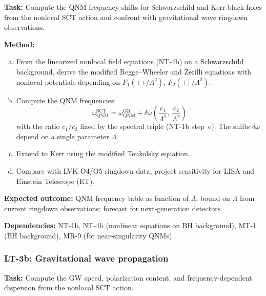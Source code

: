 \documentclass[12pt,a4paper]{article}
\newcommand{\Lam}{\Lambda}
\newcommand{\task}[1]{\noindent\textbf{Task:} #1\par}
\newcommand{\method}[1]{\noindent\textbf{Method:} #1\par}
\newcommand{\outcome}[1]{\noindent\textbf{Expected outcome:} #1\par}
\newcommand{\deps}[1]{\noindent\textbf{Dependencies:} #1\par}
\begin{document}
\task{Compute the QNM frequency shifts for Schwarzschild and Kerr black
holes from the nonlocal SCT action and confront with gravitational wave
ringdown observations.}

\method{
\begin{enumerate}[(a)]
  \item From the linearized nonlocal field equations (NT-4b) on a Schwarzschild
    background, derive the modified Regge--Wheeler and Zerilli equations with
    nonlocal potentials depending on $F_1(\Box/\Lambda^2)$, $F_2(\Box/\Lambda^2)$.
  \item Compute the QNM frequencies:
    \begin{equation}
      \omega_{\text{QNM}}^{\text{SCT}} = \omega_{\text{QNM}}^{\text{GR}}
      + \delta\omega\!\left(\frac{c_1}{\Lam^2},\, \frac{c_2}{\Lam^2}\right)
    \end{equation}
    with the ratio $c_1/c_2$ fixed by the spectral triple (NT-1b step~e).
    The shifts $\delta\omega$ depend on a single parameter $\Lam$.
  \item Extend to Kerr using the modified Teukolsky equation.
  \item Compare with LVK O4/O5 ringdown data; project sensitivity
    for LISA and Einstein Telescope (ET).
\end{enumerate}
}

\outcome{QNM frequency table as function of $\Lambda$; bound on $\Lambda$
from current ringdown observations; forecast for next-generation detectors.}

\deps{NT-1b, NT-4b (nonlinear equations on BH background), MT-1 (BH background),
MR-9 (for near-singularity QNMs).}

\subsubsection{LT-3b: Gravitational wave propagation}
\label{task:LT3b}

\task{Compute the GW speed, polarization content, and frequency-dependent
dispersion from the nonlocal SCT action.}
\end{document}
